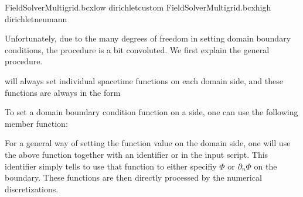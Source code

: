 \documentclass[letterpaper,10pt,english]{sphinxmanual}
\begin{document}
\begin{sphinxVerbatim}[commandchars=\\\{\},formatcom=\scriptsize]
FieldSolverMultigrid.bc\PYGZus{}x\PYGZus{}low   dirichlet\PYGZus{}custom
FieldSolverMultigrid.bc\PYGZus{}x\PYGZus{}high  dirichlet\PYGZus{}neumann
\end{sphinxVerbatim}

Unfortunately, due to the many degrees of freedom in setting domain boundary conditions, the procedure is a bit convoluted.
We first explain the general procedure.

 will always set individual space\sphinxhyphen{}time functions on each domain side, and these functions are always in the form

\begin{sphinxVerbatim}[commandchars=\\\{\},formatcom=\scriptsize]
      
\end{sphinxVerbatim}

To set a domain boundary condition function on a side, one can use the following member function:

\begin{sphinxVerbatim}[commandchars=\\\{\},formatcom=\scriptsize]
   
                                            
                                                
\end{sphinxVerbatim}

For a general way of setting the function value on the domain side, one will use the above function together with an identifier  or  in the input script.
This identifier simply tells  to use that function to either specifiy \(\Phi\) or \(\partial_n\Phi\) on the boundary.
These functions are then directly processed by the numerical discretizations.
\end{document}
